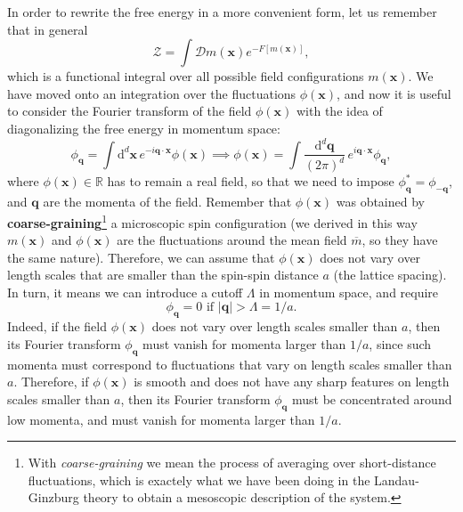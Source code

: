 In order to rewrite the free energy in a more convenient form, let us remember that in general
\[
    \mathcal{Z} = \int \mathcal{D} m(\mathbf{x}) e^{-F[m(\mathbf{x})]},
\]
which is a functional integral over all possible field configurations \( m(\mathbf{x}) \). We have moved onto an integration over the fluctuations \( \phi(\mathbf{x}) \), and now it is useful to consider the Fourier transform of the field \( \phi(\mathbf{x}) \) with the idea of diagonalizing the free energy in momentum space:
\[
    \phi_{\mathbf{q}} = \int \mathrm{d}^d \mathbf{x} \, e^{-i\mathbf{q} \cdot \mathbf{x}} \phi(\mathbf{x}) \implies \phi(\mathbf{x}) = \int \frac{\mathrm{d}^d \mathbf{q}}{(2\pi)^d} \, e^{i\mathbf{q} \cdot \mathbf{x}} \phi_{\mathbf{q}},
\]
where \( \phi(\mathbf{x}) \in \mathbb{R} \) has to remain a real field, so that we need to impose \( \phi_{\mathbf{q}}^* = \phi_{-\mathbf{q}} \), and \( \mathbf{q} \) are the momenta of the field. Remember that \( \phi(\mathbf{x}) \) was obtained by \textbf{coarse-graining}\footnote{With \textit{coarse-graining} we mean the process of averaging over short-distance fluctuations, which is exactely what we have been doing in the Landau-Ginzburg theory to obtain a mesoscopic description of the system.} a microscopic spin configuration (we derived in this way \(m(\mathbf{x})\) and \(\phi(\mathbf{x})\) are the fluctuations around the mean field \(\overline{m}\), so they have the same nature). Therefore, we can assume that \( \phi(\mathbf{x}) \) does not vary over length scales that are smaller than the spin-spin distance \( a \) (the lattice spacing). In turn, it means we can introduce a cutoff \( \Lambda \) in momentum space, and require
\[
    \phi_{\mathbf{q}} = 0 \text{ if } |\mathbf{q}| > \Lambda = 1/a.
\]
Indeed, if the field \( \phi(\mathbf{x}) \) does not vary over length scales smaller than \( a \), then its Fourier transform \( \phi_{\mathbf{q}} \) must vanish for momenta larger than \( 1/a \), since such momenta must correspond to fluctuations that vary on length scales smaller than \( a \). Therefore, if \( \phi(\mathbf{x}) \) is smooth and does not have any sharp features on length scales smaller than \( a \), then its Fourier transform \( \phi_{\mathbf{q}} \) must be concentrated around low momenta, and must vanish for momenta larger than \( 1/a \).

